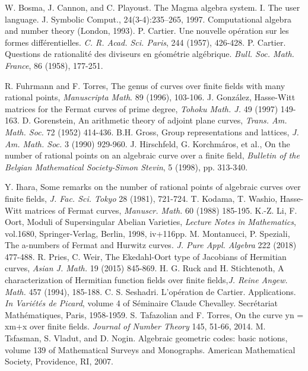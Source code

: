 
\begin{thebibliography}{99}
    W. Bosma, J. Cannon, and C. Playoust. The Magma algebra system. I. The user language. J. Symbolic Comput., 24(3-4):235–265, 1997. Computational algebra and number theory (London, 1993).
  P. Cartier. Une nouvelle opération sur les formes différentielles. {\it C. R. Acad. Sci. Paris}, 244 (1957), 426-428.
  P. Cartier. Questions de rationalité des diviseurs en géométrie algébrique. {\it Bull. Soc. Math. France}, 86 (1958), 177-251.

   R. Fuhrmann and F. Torres, The genus of curves over finite fields with many rational points, {\it Manuscripta Math}. 89 (1996), 103-106.
     J. González, Hasse-Witt matrices for the Fermat curves of prime degree, {\it Tohoku Math. J.} 49 (1997) 149-163.
    D. Gorenstein, An arithmetic theory of adjoint plane curves, {\it Trans. Am. Math. Soc.} 72 (1952) 414-436.
   B.H. Gross, Group representations and lattices, {\it J. Am. Math. Soc.} 3 (1990) 929-960.
 J. Hirschfeld, G. Korchm{\'a}ros, et al., On the number of rational points on an algebraic curve over a finite field, {\it Bulletin of the Belgian Mathematical Society-Simon Stevin}, 5 (1998), pp. 313-340.



 Y. Ihara, Some remarks on the number of rational points of algebraic curves over
finite fields, {\it J. Fac. Sci. Tokyo} 28 (1981), 721-724.
  T. Kodama, T. Washio, Hasse-Witt matrices of Fermat curves, {\it Manuscr. Math.} 60 (1988) 185-195.
   K.-Z. Li, F. Oort, Moduli of Supersingular Abelian Varieties, {\it Lecture Notes in Mathematics}, vol.1680, Springer-Verlag, Berlin, 1998, iv+116pp.
  M. Montanucci, P. Speziali, The a-numbers of Fermat and Hurwitz curves. {\it J. Pure Appl. Algebra} 222 (2018) 477-488.
      R. Pries, C. Weir, The Ekedahl-Oort type of Jacobians of Hermitian curves, {\it Asian J. Math.} 19 (2015) 845-869.
H. G. Ruck and H. Stichtenoth, A characterization of Hermitian function fields
over finite fields,{\it J. Reine Angew. Math.} 457 (1994), 185-188.
   C. S. Seshadri. L’opération de Cartier. Applications. {\it In Variétés de Picard}, volume 4 of Séminaire Claude Chevalley. Secrétariat Mathématiques, Paris, 1958-1959.
  S. Tafazolian and F. Torres, On the curve yn = xm+x over finite fields. {\it Journal of Number Theory} 145, 51-66, 2014.
  M. Tsfasman, S. Vladut, and D. Nogin. Algebraic geometric codes: basic notions, volume 139 of Mathematical Surveys and Monographs. American Mathematical Society, Providence, RI, 2007.


\end{thebibliography}
